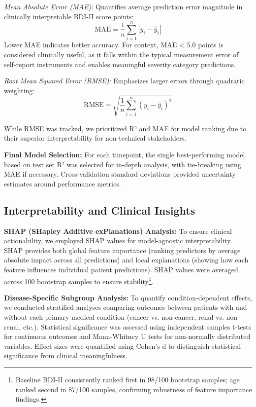 \documentclass[conference]{IEEEtran}
\begin{document}
\textit{Mean Absolute Error (MAE):} Quantifies average prediction error magnitude in clinically interpretable BDI-II score points:
\[
\text{MAE} = \frac{1}{n} \sum_{i=1}^{n} |y_i - \hat{y}_i|
\]
Lower MAE indicates better accuracy. For context, MAE < 5.0 points is considered clinically useful, as it falls within the typical measurement error of self-report instruments and enables meaningful severity category predictions.

\textit{Root Mean Squared Error (RMSE):} Emphasizes larger errors through quadratic weighting:
\[
\text{RMSE} = \sqrt{\frac{1}{n} \sum_{i=1}^{n} (y_i - \hat{y}_i)^2}
\]

While RMSE was tracked, we prioritized R² and MAE for model ranking due to their superior interpretability for non-technical stakeholders.

\textbf{Final Model Selection:} For each timepoint, the single best-performing model based on test set R² was selected for in-depth analysis, with tie-breaking using MAE if necessary. Cross-validation standard deviations provided uncertainty estimates around performance metrics.

\subsection{Interpretability and Clinical Insights}

\textbf{SHAP (SHapley Additive exPlanations) Analysis:} To ensure clinical actionability, we employed SHAP values for model-agnostic interpretability. SHAP provides both global feature importance (ranking predictors by average absolute impact across all predictions) and local explanations (showing how each feature influences individual patient predictions). SHAP values were averaged across 100 bootstrap samples to ensure stability\footnote{Baseline BDI-II consistently ranked first in 98/100 bootstrap samples; age ranked second in 87/100 samples, confirming robustness of feature importance findings.}.

\textbf{Disease-Specific Subgroup Analysis:} To quantify condition-dependent effects, we conducted stratified analyses comparing outcomes between patients with and without each primary medical condition (cancer vs. non-cancer, renal vs. non-renal, etc.). Statistical significance was assessed using independent samples t-tests for continuous outcomes and Mann-Whitney U tests for non-normally distributed variables. Effect sizes were quantified using Cohen's d to distinguish statistical significance from clinical meaningfulness.
\end{document}
